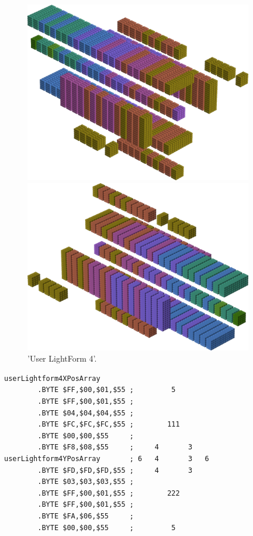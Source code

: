 \begin{minipage}[b]{0.48\linewidth}
\begin{figure}[H]
    \centering
    \begin{adjustbox}{width=5cm,margin=0cm 0cm}
      \includegraphics[width=10cm]{src/colorspace_patterns/pattern12-45.png}%
    \end{adjustbox}
    \begin{adjustbox}{width=5cm,margin=0cm 0cm}
      \includegraphics[width=10cm]{src/colorspace_patterns/pattern12-225.png}%
    \end{adjustbox}
\caption{'User LightForm 4'.}
\end{figure}
\end{minipage}
\begin{minipage}[b]{0.48\linewidth}
\begin{lrbox}{\mybox}%
\begin{lstlisting}[basicstyle=\ttfamily\tiny,escapechar=\%]
userLightform4XPosArray
        .BYTE $FF,$00,$01,$55 ;         5        
        .BYTE $FF,$00,$01,$55 ;                  
        .BYTE $04,$04,$04,$55 ;                  
        .BYTE $FC,$FC,$FC,$55 ;        111       
        .BYTE $00,$00,$55     ;                  
        .BYTE $F8,$08,$55     ;     4       3    
userLightform4YPosArray       ; 6   4       3   6
        .BYTE $FD,$FD,$FD,$55 ;     4       3    
        .BYTE $03,$03,$03,$55 ;                  
        .BYTE $FF,$00,$01,$55 ;        222       
        .BYTE $FF,$00,$01,$55 ;                  
        .BYTE $FA,$06,$55     ;                  
        .BYTE $00,$00,$55     ;         5        
\end{lstlisting}
\end{lrbox}%
\scalebox{0.8}{\usebox{\mybox}}

\end{minipage}
